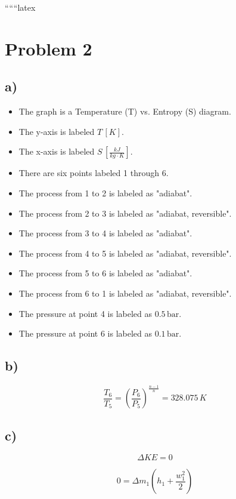 
``````latex


\section*{Problem 2}

\subsection*{a)}

\begin{itemize}
    \item The graph is a Temperature (T) vs. Entropy (S) diagram.
    \item The y-axis is labeled \( T \, [K] \).
    \item The x-axis is labeled \( S \, \left[ \frac{kJ}{kg \cdot K} \right] \).
    \item There are six points labeled 1 through 6.
    \item The process from 1 to 2 is labeled as "adiabat".
    \item The process from 2 to 3 is labeled as "adiabat, reversible".
    \item The process from 3 to 4 is labeled as "adiabat".
    \item The process from 4 to 5 is labeled as "adiabat, reversible".
    \item The process from 5 to 6 is labeled as "adiabat".
    \item The process from 6 to 1 is labeled as "adiabat, reversible".
    \item The pressure at point 4 is labeled as \( 0.5 \, \text{bar} \).
    \item The pressure at point 6 is labeled as \( 0.1 \, \text{bar} \).
\end{itemize}

\subsection*{b)}

\[
\frac{T_6}{T_5} = \left( \frac{P_6}{P_5} \right)^{\frac{n-1}{n}} = 328.075 \, K
\]

\subsection*{c)}

\[
\Delta KE = 0
\]

\[
0 = \Delta m_1 \left( h_1 + \frac{w_1^2}{2} \right)
\]

